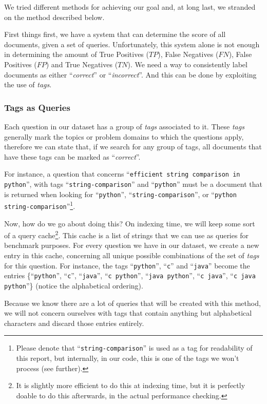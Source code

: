 \documentclass[11pt]{article}
\begin{document}
We tried different methods for achieving our goal and, at long last, we stranded on the method described below.

First things first, we have a system that can determine the score of all documents, given a set of queries. Unfortunately, this system alone is not enough in determining the amount of True Positives ($TP$), False Negatives ($FN$), False Positives ($FP$) and True Negatives ($TN$). We need a way to consistently label documents as either ``\textit{correct}'' or ``\textit{incorrect}''. And this can be done by exploiting the use of \textit{tags}.

\subsubsection{Tags as Queries}
Each question in our dataset has a group of \textit{tags} associated to it. These \textit{tags} generally mark the topics or problem domains to which the questions apply, therefore we can state that, if we search for any group of tags, all documents that have these tags can be marked as ``\textit{correct}''.

For instance, a question that concerns ``\texttt{efficient string comparison in python}'', with tags ``\texttt{string-comparison}'' and ``\texttt{python}'' must be a document that is returned when looking for ``\texttt{python}'', ``\texttt{string-comparison}'', or ``\texttt{python string-comparison}''\footnote{Please denote that ``\texttt{string-comparison}'' is used as a tag for readability of this report, but internally, in our code, this is one of the tags we won't process (see further).}.

Now, how do we go about doing this? On indexing time, we will keep some sort of a query cache\footnote{It is slightly more efficient to do this at indexing time, but it is perfectly doable to do this afterwards, in the actual performance checking.}. This cache is a list of strings that we can use as queries for benchmark purposes. For every question we have in our dataset, we create a new entry in this cache, concerning all unique possible combinations of the set of \textit{tags} for this question. For instance, the tags ``\texttt{python}'', ``\texttt{c}'' and ``\texttt{java}'' become the entries \{``\texttt{python}'', ``\texttt{c}'', ``\texttt{java}'', ``\texttt{c python}'', ``\texttt{java python}'', ``\texttt{c java}'', ``\texttt{c java python}''\} (notice the alphabetical ordering).

Because we know there are a lot of queries that will be created with this method, we will not concern ourselves with tags that contain anything but alphabetical characters and discard those entries entirely.
\end{document}
